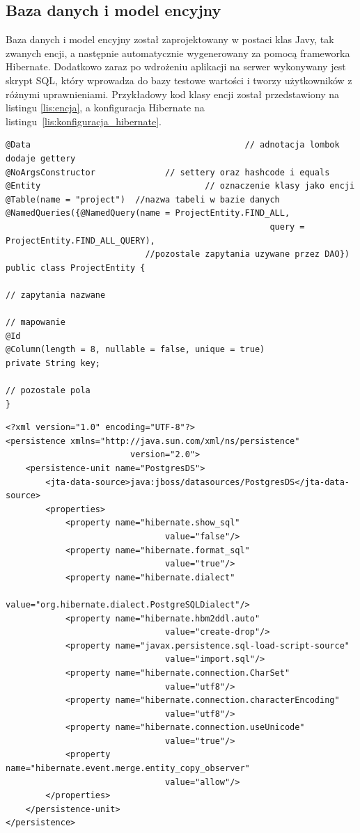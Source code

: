 \subsection{Baza danych i model encyjny}
Baza danych i model encyjny został zaprojektowany w postaci klas Javy, tak zwanych encji, a następnie automatycznie wygenerowany za pomocą frameworka Hibernate. Dodatkowo zaraz po wdrożeniu aplikacji na serwer wykonywany jest skrypt SQL, który wprowadza do bazy testowe wartości i tworzy użytkowników z różnymi uprawnieniami. Przykładowy kod klasy encji został przedstawiony na listingu \ref{lis:encja}, a konfiguracja Hibernate na listingu~\ref{lis:konfiguracja_hibernate}.

\begin{lstlisting}[caption={Przykładowa klasa encji}, label=lis:encja, numbers=none]
@Data									 		// adnotacja lombok dodaje gettery
@NoArgsConstructor 				// settery oraz hashcode i equals
@Entity				  	 		 		// oznaczenie klasy jako encji
@Table(name = "project")  //nazwa tabeli w bazie danych
@NamedQueries({@NamedQuery(name = ProjectEntity.FIND_ALL, 
													 query = ProjectEntity.FIND_ALL_QUERY),
   							//pozostale zapytania uzywane przez DAO})
public class ProjectEntity {

// zapytania nazwane

// mapowanie
@Id
@Column(length = 8, nullable = false, unique = true)
private String key;

// pozostale pola
}\end{lstlisting}
\newpage
\begin{lstlisting}[caption={Konfiguracja Hibernate}, label=lis:konfiguracja_hibernate, numbers=none]
<?xml version="1.0" encoding="UTF-8"?>
<persistence xmlns="http://java.sun.com/xml/ns/persistence"
					 	 version="2.0">
	<persistence-unit name="PostgresDS">
		<jta-data-source>java:jboss/datasources/PostgresDS</jta-data-source>
		<properties>
			<property name="hibernate.show_sql" 
								value="false"/>
			<property name="hibernate.format_sql" 
								value="true"/>
			<property name="hibernate.dialect" 
								value="org.hibernate.dialect.PostgreSQLDialect"/>
			<property name="hibernate.hbm2ddl.auto" 
								value="create-drop"/>
			<property name="javax.persistence.sql-load-script-source" 
								value="import.sql"/>
			<property name="hibernate.connection.CharSet" 
								value="utf8"/>
			<property name="hibernate.connection.characterEncoding" 
								value="utf8"/>
			<property name="hibernate.connection.useUnicode" 
								value="true"/>
			<property name="hibernate.event.merge.entity_copy_observer" 
								value="allow"/>
		</properties>
	</persistence-unit>
</persistence>\end{lstlisting}

